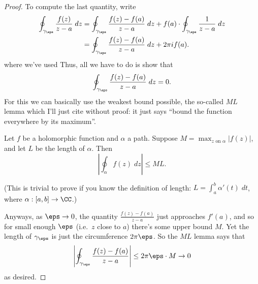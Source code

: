\begin{proof}
	To compute the last quantity, write
	\begin{align*}
		\oint_{\gamma_\eps} \frac{f(z)}{z-a} \; dz
		&=
		\oint_{\gamma_\eps} \frac{f(z)-f(a)}{z-a} \; dz
		+
		f(a) \cdot \oint_{\gamma_\eps} \frac{1}{z-a} \; dz \\
		&=
		\oint_{\gamma_\eps} \frac{f(z)-f(a)}{z-a} \; dz
		+
		2\pi i f(a).
	\end{align*}
	where we've used 
	Thus, all we have to do is show that 
	\[ \oint_{\gamma_\eps} \frac{f(z)-f(a)}{z-a} \; dz = 0. \]
	For this we can basically use the weakest bound possible, the so-called $ML$ lemma
	which I'll just cite without proof:
	it just says ``bound the function everywhere by its maximum''.
	\begin{lemma}
		Let $f$ be a holomorphic function and $\alpha$ a path.
		Suppose $M = \max_{z \text{ on } \alpha} \left\lvert f(z) \right\rvert$, and
		let $L$ be the length of $\alpha$.
		Then
		\[ \left\lvert \oint_\alpha f(z) \; dz \right\rvert \le ML. \]
	\end{lemma}
	(This is trivial to prove if you know the definition of length:
	$L = \int_a^b \alpha'(t) \; dt$, where $\alpha : [a,b] \to \CC$.)

	Anyways, as $\eps \to 0$, the quantity $\frac{f(z)-f(a)}{z-a}$ just approaches $f'(a)$,
	and so for small enough $\eps$ (i.e.\ $z$ close to $a$) there's some upper bound $M$.
	Yet the length of $\gamma_\eps$ is just the circumference $2\pi \eps$.
	So the $ML$ lemma says that
	\[ \left\lvert \oint_{\gamma_\eps} \frac{f(z)-f(a)}{z-a} \right\rvert
		\le 2\pi\eps \cdot M \to 0
	\]
	as desired.
\end{proof}

